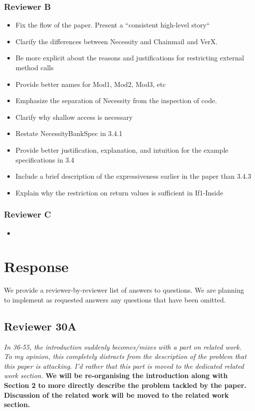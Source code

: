 \documentclass[11pt]{amsart}
\newcommand{\rev}[1]{\emph #1}
\newcommand{\us}[1]{\bf #1}
\begin{document}
\subsubsection*{Reviewer B}
\begin{itemize}
\item Fix the flow of the paper. Present a ``consistent high-level story``
\item Clarify the differences between Necessity and Chainmail and VerX.
\item Be more explicit about the reasons and justifications for restricting external method calls
\item Provide better names for Mod1, Mod2, Mod3, etc
\item Emphasize the separation of Necessity from the inspection of code.
\item Clarify why shallow access is necessary
\item Restate NecessityBankSpec in 3.4.1
\item Provide better justification, explanation, and intuition for the example specifications in 3.4
\item Include a brief description of the expressiveness earlier in the paper than 3.4.3
\item Explain why the restriction on return values is sufficient in If1-Inside
\end{itemize}

\subsubsection*{Reviewer C}
\begin{itemize}
\item 
\end{itemize}


  
\section{Response} We provide a reviewer-by-reviewer list of answers to questions. We are planning to implement as requested answers any questions that have been omitted.
  
  \subsection*{Reviewer 30A}
  
{\rev {{In 36-55, the introduction suddenly becomes/mixes with a part on related work. To my opinion, this completely distracts from the description of the problem that this paper is attacking. I'd rather that this part is moved to the dedicated related work section.}}}
{\us{{We will be re-organising the introduction along with Section 2 to more directly describe the problem tackled by the paper. Discussion of the related work will be moved to the related work section.}}}
\end{document}
